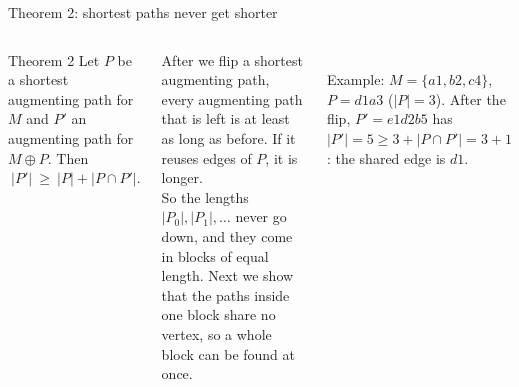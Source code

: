 \documentclass[aspectratio=169,11pt]{beamer}
\begin{document}
\begin{frame}{Theorem 2: shortest paths never get shorter}
\begin{columns}[c]
\begin{block}{Theorem 2}
Let $P$ be a shortest augmenting path for $M$ and $P'$ an augmenting path for $M\oplus P$. Then $\ |P'|\ \ge\ |P|+|P\cap P'|.$
\end{block}
\small
After we flip a shortest augmenting path, every augmenting path that is left is at least as long as before. If it reuses edges of $P$, it is longer.\\[3mm]
So the lengths $|P_0|,|P_1|,\dots$ never go down, and they come in blocks of equal length. Next we show that the paths inside one block share no vertex, so a whole block can be found at once.
\centering
{}\\[1mm]
{\footnotesize Example: $M=\{a1,b2,c4\}$, $P=d1a3$ ($|P|=3$). After the flip, $P'=e1d2b5$ has $|P'|=5\ge 3+|P\cap P'|=3+1$: the shared edge is $d1$.}
\end{columns}
\end{frame}
\end{document}
